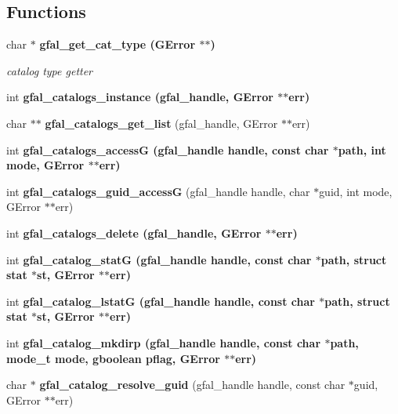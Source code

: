 \subsection*{Functions}
\begin{CompactItemize}
\item 
char $\ast$ \bf{gfal\_\-get\_\-cat\_\-type} (GError $\ast$$\ast$)
\begin{CompactList}\small\item\em catalog type getter \item\end{CompactList}\item 
int \bf{gfal\_\-catalogs\_\-instance} (gfal\_\-handle, GError $\ast$$\ast$err)
\item 
char $\ast$$\ast$ \textbf{gfal\_\-catalogs\_\-get\_\-list} (gfal\_\-handle, GError $\ast$$\ast$err)\label{gfal__common__catalog_8h_01278095d52a0e33643de8c084ccba76}

\item 
int \bf{gfal\_\-catalogs\_\-access\-G} (gfal\_\-handle handle, const char $\ast$path, int mode, GError $\ast$$\ast$err)
\item 
int \textbf{gfal\_\-catalogs\_\-guid\_\-access\-G} (gfal\_\-handle handle, char $\ast$guid, int mode, GError $\ast$$\ast$err)\label{gfal__common__catalog_8h_fdd144370f8c6df2564eaddbf26e2fd5}

\item 
int \bf{gfal\_\-catalogs\_\-delete} (gfal\_\-handle, GError $\ast$$\ast$err)
\item 
int \bf{gfal\_\-catalog\_\-stat\-G} (gfal\_\-handle handle, const char $\ast$path, struct stat $\ast$st, GError $\ast$$\ast$err)
\item 
int \bf{gfal\_\-catalog\_\-lstat\-G} (gfal\_\-handle handle, const char $\ast$path, struct stat $\ast$st, GError $\ast$$\ast$err)
\item 
int \bf{gfal\_\-catalog\_\-mkdirp} (gfal\_\-handle handle, const char $\ast$path, mode\_\-t mode, gboolean pflag, GError $\ast$$\ast$err)
\item 
char $\ast$ \textbf{gfal\_\-catalog\_\-resolve\_\-guid} (gfal\_\-handle handle, const char $\ast$guid, GError $\ast$$\ast$err)\label{gfal__common__catalog_8h_4955825d7c275f3dfae9a57232642370}


\end{CompactItemize}
